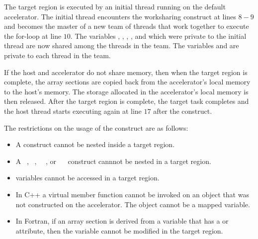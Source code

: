The target region is executed by an initial thread running on the default
accelerator.  The initial thread encounters the 
worksharing construct at lines $8-9$ and becomes the master of a new team of
threads that work together to execute the for-loop at line $10$.  
The variables , , , , and  which were private to the initial
thread are now shared among the threads in the team.  The variables  and
 are private to each thread in the team.

If the host and accelerator do not share memory, then when the target region is
complete, the array sections are copied back from the accelerator's local
memory to the host's memory.  The storage allocated in the accelerator's local
memory is then released.  After the target region is complete, the target task
completes and the host thread starts executing again at line $17$ after the
 construct.

The restrictions on the usage of the  construct are as follows:

\begin{itemize}

\item A  construct cannot be nested inside a target region.

\item A ~, ~, ~~, or ~~ construct cannnot be nested in a target region.

\item {} variables cannot be accessed in a target region.

\item In C++ a virtual member function cannot be invoked on an object that was
not constructed on the accelerator.  The object cannot be a mapped variable.

\item In Fortran, if an array section is derived from a variable that has a
 or  attribute, then the variable cannot be
modified in the target region.

\end{itemize}

